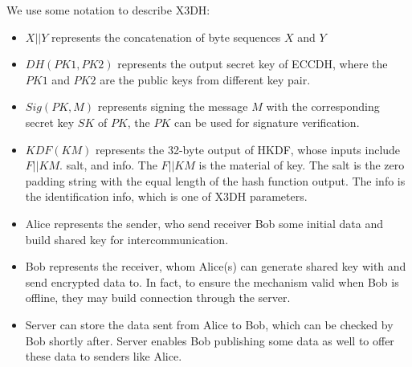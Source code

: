 \documentclass[11pt,en]{elegantpaper}
\begin{document}
We use some notation to describe X3DH:
\begin{itemize}
    \item $X||Y$ represents the concatenation of byte sequences $X$ and $Y$
    \item $DH(PK1,PK2)$ represents the output secret key of ECCDH, where the $PK1$ and $PK2$ are the public keys from different key pair.
    \item $Sig(PK,M)$ represents signing the message $M$ with the corresponding secret key $SK$ of $PK$, the $PK$ can be used for signature verification.
    \item $KDF(KM)$ represents the 32-byte output of HKDF, whose inputs include $F||KM$. salt, and info. The $F||KM$ is the material of key. The salt is the zero padding string with the equal length of the hash function output. The info is the identification info, which is one of X3DH parameters.
    \item Alice represents the sender, who send receiver Bob some initial data and build shared key for intercommunication.
    \item Bob represents the receiver, whom Alice(s) can generate shared key with and send encrypted data to. In fact, to ensure the mechanism valid when Bob is offline, they may build connection through the server.
    \item Server can store the data sent from Alice to Bob, which can be checked by Bob shortly after. Server enables Bob publishing some data as well to offer these data to senders like Alice.
\end{itemize}

\end{document}
